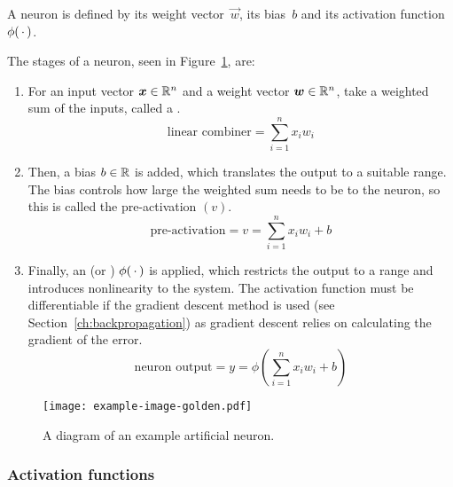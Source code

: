 
A neuron is defined by its weight vector~\(\vec{w}\), its bias~\(b\) and its activation function~\(\phi(\,\cdot\,)\).

The stages of a neuron, seen in Figure~\ref{fig:neuron-example}, are:
\begin{enumerate}
	\item For an input vector \(\bm{x} \in \mathbb{R}^n\) and a weight vector \(\bm{w} \in \mathbb{R}^n\), take a weighted sum of the inputs, called a .
	      \[ \text{linear combiner} = \sum_{i=1}^{n}{x_i w_i} \]
	\item Then, a bias \(b \in \mathbb{R}{}\) is added, which translates the output to a suitable range.
	      The bias controls how large the weighted sum needs to be to  the neuron, so this is called the pre-activation \((v)\).
	      \[ \text{pre-activation} = v = \sum_{i=1}^{n}{x_i w_i} + b \]
	\item Finally, an  (or ) \(\phi(\,\cdot\,)\) is applied, which restricts the output to a range and introduces nonlinearity to the system.
	      The activation function must be differentiable if the gradient descent method is used (see Section~\ref{ch:backpropagation}) as gradient descent relies on calculating the gradient of the error.
	      \[ \text{neuron output} = y = \phi\left(\sum_{i=1}^{n}{x_i w_i} + b \right) \]
\end{enumerate}

\begin{figure}[htbp]
	\centering
	\texttt{[image: example-image-golden.pdf]}
	\caption{A diagram of an example artificial neuron.}
	\label{fig:neuron-example}
\end{figure}

\subsubsection{Activation functions}

